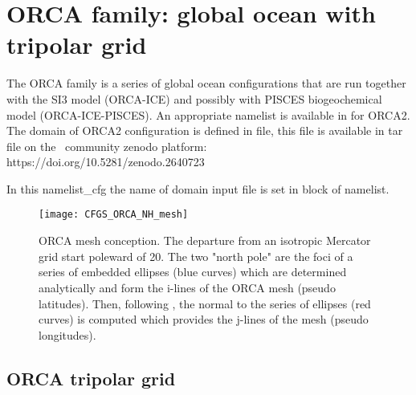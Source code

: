 \documentclass[../main/NEMO_manual]{subfiles}
\begin{document}
\section{ORCA family: global ocean with tripolar grid}
\label{sec:CFGS_orca}

The ORCA family is a series of global ocean configurations that are run together with
the SI3 model (ORCA-ICE) and possibly with PISCES biogeochemical model (ORCA-ICE-PISCES).
An appropriate namelist is available in  for ORCA2.
The domain of ORCA2 configuration is defined in  file,
this file is available in tar file on the \NEMO\ community zenodo platform: \\
https://doi.org/10.5281/zenodo.2640723

In this namelist\_cfg the name of domain input file is set in  block of namelist.

\begin{figure}[!t]
  \centering
  \texttt{[image: CFGS\_ORCA\_NH\_mesh]}
  \caption[ORCA mesh conception]{
    ORCA mesh conception.
    The departure from an isotropic Mercator grid start poleward of 20.
    The two "north pole" are the foci of a series of embedded ellipses (blue curves) which
    are determined analytically and form the i-lines of the ORCA mesh (pseudo latitudes).
    Then, following \citet{madec.imbard_CD96},
    the normal to the series of ellipses (red curves) is computed which
    provides the j-lines of the mesh (pseudo longitudes).}
  \label{fig:CFGS_ORCA_msh}
\end{figure}

\subsection{ORCA tripolar grid}
\label{subsec:CFGS_orca_grid}
\end{document}
